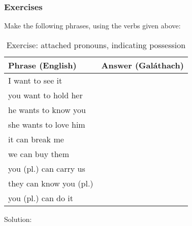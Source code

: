\newpage
\subsubsection{Exercises}

Make the following phrases, using the verbs given above:
\begin{table}[H]
\centering
\begin{tabu}{|l|M{10.0cm}|}
  \toprule
  \textbf{Phrase (English)} & \textbf{Answer (Gal\'{a}thach)}\\
  \toprule
  I want to see it & \\
  \midrule
  you want to hold her & \\
  \midrule
  he wants to know you & \\
  \midrule
  she wants to love him & \\
  \midrule
  it can break me & \\
  \midrule
  we can buy them & \\
  \midrule
  you (pl.) can carry us & \\
  \midrule
  they can know you (pl.) & \\
  \midrule
  you (pl.) can do it & \\
  \bottomrule
\end{tabu}
\label{exercise_attached_pronouns_indicating_possession}
\caption{Exercise: attached pronouns, indicating possession}
\end{table}

\newpage
Solution:
\begin{table}[H]
\centering
{}
\label{solution_attached_pronouns_indicating_possession}
\caption{Solution: attached pronouns, indicating possession}
\end{table}
